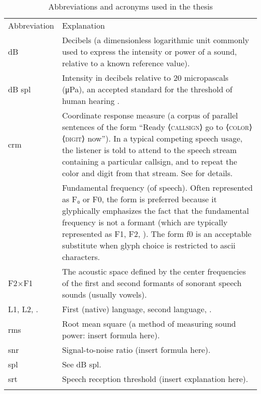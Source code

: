 \begin{table}
	\caption[Abbreviations and acronyms]{Abbreviations and acronyms used in the thesis \label{tab:Abbr}}
	\centering
	\begin{tabu} to \textwidth [c]{X[c m] X[5 m]}
		\toprule
		\everyrow{\midrule}
		\rowfont[c]{\bfseries} Abbreviation & Explanation\\
		{dB} & Decibels (a dimensionless logarithmic unit commonly used to express the intensity or power of a sound, relative to a known reference value).\\ 
		{dB \ac{spl}} & Intensity in decibels relative to 20 micropascals (μPa), an accepted standard for the threshold of human hearing .\\
		\ac{crm} & Coordinate response measure (a corpus of parallel sentences of the form “Ready ⟨\textsc{callsign}⟩ go to ⟨\textsc{color}⟩ ⟨\textsc{digit}⟩ now”).  In a typical competing speech usage, the listener is told to attend to the speech stream containing a particular callsign, and to repeat the color and digit from that stream.  See \citet{BoliaEtAl2000} for details.\\
		\fo & Fundamental frequency (of speech).  Often represented as F₀ or F0, the form \fo{} is preferred because it glyphically emphasizes the fact that the fundamental frequency is not a formant (which are typically represented as F1, F2, \etc).  The form f0 is an acceptable substitute when glyph choice is restricted to \ac{ascii} characters.\\
		F2×F1 & The acoustic space defined by the center frequencies of the first and second formants of sonorant speech sounds (usually vowels).\\
		L1, L2, \etc. & First (native) language, second language, \etc.\\
		\ac{rms} & Root mean square (a method of measuring sound power: insert formula here).\\
		\ac{snr} & Signal-to-noise ratio (insert formula here).\\
		\ac{spl} & See {dB \ac{spl}}.\\
		\everyrow{}
		\ac{srt} & Speech reception threshold (insert explanation here).\\
		\bottomrule
	\end{tabu}
\end{table}
